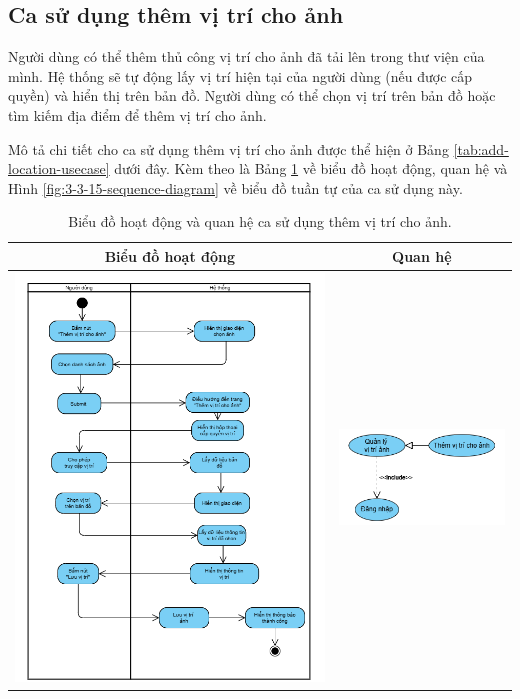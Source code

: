 \subsection{Ca sử dụng thêm vị trí cho ảnh}

Người dùng có thể thêm thủ công vị trí cho ảnh đã tải lên trong thư viện của mình. Hệ thống sẽ tự động lấy vị trí hiện tại của người dùng (nếu được cấp quyền) và hiển thị trên bản đồ. Người dùng có thể chọn vị trí trên bản đồ hoặc tìm kiếm địa điểm để thêm vị trí cho ảnh.

Mô tả chi tiết cho ca sử dụng thêm vị trí cho ảnh được thể hiện ở Bảng \ref{tab:add-location-usecase} dưới đây. Kèm theo là Bảng \ref{tab:add-location-usecase-activity} về biểu đồ hoạt động, quan hệ và Hình \ref{fig:3-3-15-sequence-diagram} về biểu đồ tuần tự của ca sử dụng này. 

\noindent 
\begin{table}[H]
\centering
\begin{tabular}{| c | c |}
    \hline
    \textbf{Biểu đồ hoạt động} & \textbf{Quan hệ} \\ 
    \hline
    \includegraphics[width=0.6\linewidth]{figures/c3/3-3-15-activity-diagram.png} 
    &  
    \includegraphics[width=0.35\linewidth]{figures/c3/3-3-15-relationship.png} \\ 
    \hline
\end{tabular}
\caption{Biểu đồ hoạt động và quan hệ ca sử dụng thêm vị trí cho ảnh.}
\label{tab:add-location-usecase-activity}
\end{table}


